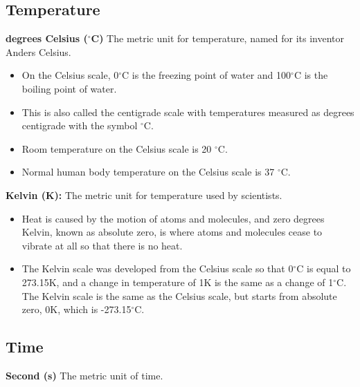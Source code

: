 \documentclass{article}
\begin{document}
\subsection*{Temperature}
\textbf{degrees Celsius ($^{\circ}$C)} The metric unit for temperature, named for its inventor Anders Celsius.
\begin{itemize}
\item On the Celsius scale, 0$^{\circ}$C is the freezing point of water and 100$^{\circ}$C is the boiling point of water.
\item This is also called the centigrade scale with temperatures measured as degrees centigrade with the symbol $^\circ$C.
\item Room temperature on the Celsius scale is 20 $^\circ$C.
\item Normal human body temperature on the Celsius scale is 37 $^\circ$C.
\end{itemize}

\textbf{Kelvin (K):}
The metric unit for temperature used by scientists.
\begin{itemize}
\item Heat is caused by the motion of atoms and molecules, and zero degrees Kelvin, known as absolute zero, is where atoms and molecules cease to vibrate at all so that there is no heat.
\item The Kelvin scale was developed from the Celsius scale so that 0$^{\circ}$C is equal to 273.15K, and a change in temperature of 1K is the same as a change of 1$^{\circ}$C.  The Kelvin scale is the same as the Celsius scale, but starts from absolute zero, 0K, which is -273.15$^{\circ}$C.
\end{itemize}

\subsection*{Time}
\textbf{Second (s)} The metric unit of time.
\end{document}
